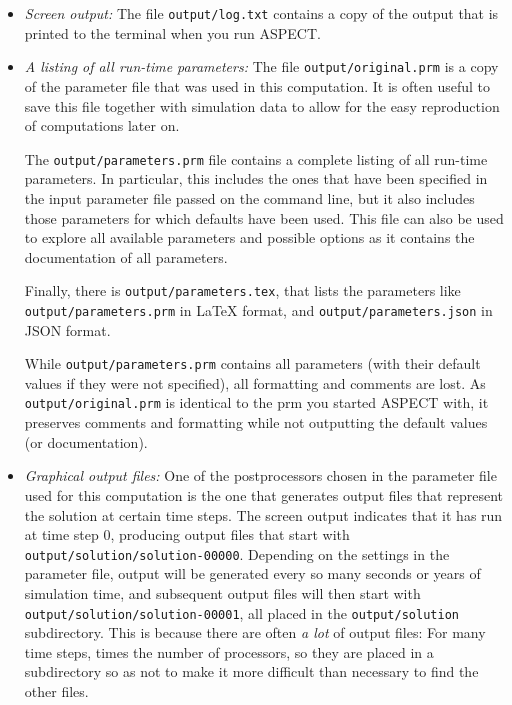 \documentclass{article}
\newcommand{\aspect}{\textsc{ASPECT}}
\begin{document}
\begin{itemize}

\item \textit{Screen output:} The file \texttt{output/log.txt} contains a copy
  of the output that is printed to the terminal when you run \aspect{}.

\item \textit{A listing of all run-time parameters:} The file
  \texttt{output/original.prm} is a copy of the parameter file that was used
  in this computation. It is often useful to save this file together with
  simulation data to allow for the easy reproduction of computations later on.

  The \texttt{output/parameters.prm} file contains a complete listing of all
  run-time parameters. In particular, this includes the ones that have been
  specified in the input parameter file passed on the command line, but it
  also includes those parameters for which defaults have been used. This file
  can also be used to explore all available parameters and possible options as
  it contains the documentation of all parameters.

  Finally, there is \texttt{output/parameters.tex}, that lists the parameters
  like \texttt{output/parameters.prm} in \LaTeX{} format, and
  \texttt{output/parameters.json} in JSON format.
  
  While \texttt{output/parameters.prm} contains all parameters (with their
  default values if they were not specified), all formatting and comments are
  lost. As \texttt{output/original.prm} is identical to the prm you started
  \aspect{} with, it preserves comments and formatting while not outputting
  the default values (or documentation).

\item \textit{Graphical output files:} One of the postprocessors chosen
  in the parameter file used for this computation is the one that generates
  output files that represent the solution at certain time steps. The screen output
  indicates that it has run at time step 0, producing output files that start
  with \texttt{output/solution/solution-00000}. Depending on the settings in the
  parameter file, output will be generated every so many seconds or years of
  simulation time, and subsequent output files will then start with
  \texttt{output/solution/solution-00001}, all placed in the
  \texttt{output/solution} subdirectory. This is because there are often
  \textit{a lot} of output files: For many time steps, times the number of
  processors, so they are placed in a subdirectory so as not to make it more
  difficult than necessary to find the other files.
  

\end{itemize}
\end{document}

